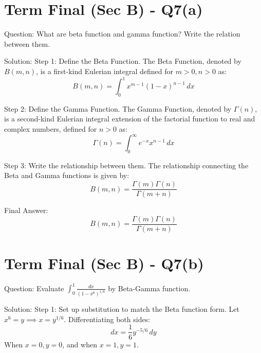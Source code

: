 \documentclass{article}
\begin{document}
\section*{Term Final (Sec B) - Q7(a)}
Question:
What are beta function and gamma function? Write the relation between them.

Solution:
Step 1: Define the Beta Function.
The Beta Function, denoted by \(B(m, n)\), is a first-kind Eulerian integral defined for \(m > 0, n > 0\) as:
\[
B(m, n) = \int_0^1 x^{m-1} (1-x)^{n-1} \, dx
\]

Step 2: Define the Gamma Function.
The Gamma Function, denoted by \(\Gamma(n)\), is a second-kind Eulerian integral extension of the factorial function to real and complex numbers, defined for \(n > 0\) as:
\[
\Gamma(n) = \int_0^\infty e^{-x} x^{n-1} \, dx
\]

Step 3: Write the relationship between them.
The relationship connecting the Beta and Gamma functions is given by:
\[
B(m, n) = \frac{\Gamma(m) \Gamma(n)}{\Gamma(m+n)}
\]

Final Answer:
\[
\boxed{B(m, n) = \frac{\Gamma(m) \Gamma(n)}{\Gamma(m+n)}}
\]

\section*{Term Final (Sec B) - Q7(b)}
Question:
Evaluate \(\int_0^1 \frac{dx}{(1-x^6)^{1/6}}\) by Beta-Gamma function.

Solution:
Step 1: Set up substitution to match the Beta function form.
Let \(x^6 = y \implies x = y^{1/6}\).
Differentiating both sides:
\[
dx = \frac{1}{6} y^{-5/6} \, dy
\]
When \(x=0, y=0\), and when \(x=1, y=1\).
\end{document}
